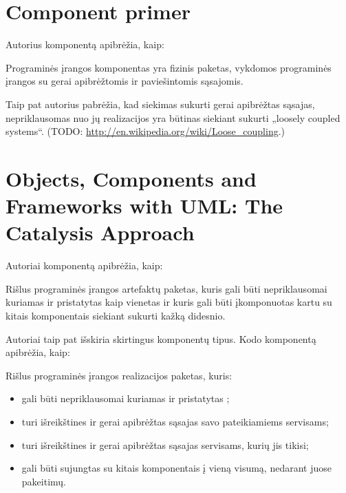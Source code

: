 \section{Component primer}

Autorius komponentą apibrėžia, kaip\cite{Hopkins:2000:CP:352183.352198}:
\begin{defn}[Komponentas]
  Programinės įrangos komponentas yra fizinis paketas, vykdomos
   programinės įrangos su gerai apibrėžtomis ir
  paviešintomis sąsajomis.
\end{defn}

Taip pat autorius pabrėžia, kad siekimas sukurti gerai apibrėžtas sąsajas,
nepriklausomas nuo jų realizacijos yra būtinas siekiant sukurti
„loosely coupled systems“.
(TODO: \url{http://en.wikipedia.org/wiki/Loose_coupling}.)

\section{Objects, Components and Frameworks with UML: The Catalysis
Approach}

Autoriai komponentą apibrėžia,
kaip\cite[385]{objects-components-and-frameworks-with-uml}:
\begin{defn}
  Rišlus programinės įrangos artefaktų paketas, kuris gali būti
  nepriklausomai kuriamas ir pristatytas  kaip vienetas
  ir kuris gali būti įkomponuotas kartu su kitais komponentais siekiant
  sukurti kažką didesnio.
\end{defn}

Autoriai taip pat išskiria skirtingus komponentų tipus. Kodo komponentą
apibrėžia, kaip\cite[386]{objects-components-and-frameworks-with-uml}:
\begin{defn}
  Rišlus programinės įrangos realizacijos  paketas,
  kuris:
  \begin{itemize}
    \item gali būti nepriklausomai kuriamas ir pristatytas ;
    \item turi išreikštines ir gerai apibrėžtas sąsajas savo pateikiamiems
      servisams;
    \item turi išreikštines ir gerai apibrėžtas sąsajas servisams, kurių
      jis tikisi;
    \item gali būti sujungtas su kitais komponentais į vieną visumą,
      nedarant juose pakeitimų.
  \end{itemize}
\end{defn}

